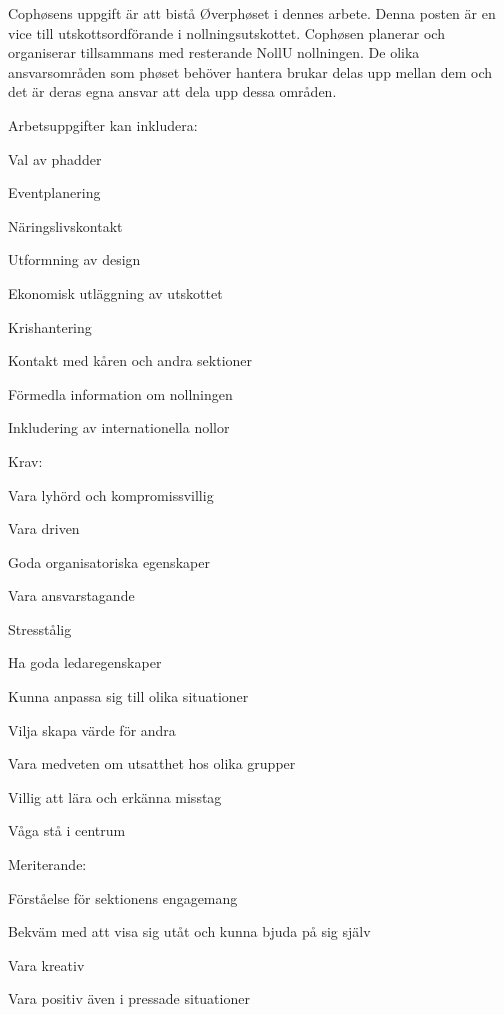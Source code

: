 \documentclass[10pt]{article}
\def\post{Co-phøsare}
\def\doctitle{Kravprofil för \post}
\begin{document}
\heading{\doctitle}

Cophøsens uppgift är att bistå Øverphøset i dennes arbete. Denna posten är en vice till utskottsordförande i nollningsutskottet. Cophøsen planerar och organiserar tillsammans  med resterande NollU nollningen. De olika ansvarsområden som phøset behöver hantera brukar delas upp mellan dem och det är deras egna ansvar att dela upp dessa områden.

Arbetsuppgifter kan inkludera:
\begin{dashlist}
    \item Val av phadder 
    \item Eventplanering
    \item Näringslivskontakt
    \item Utformning av design
    \item Ekonomisk utläggning av utskottet
    \item Krishantering
    \item Kontakt med kåren och andra sektioner
    \item Förmedla information om nollningen
    \item Inkludering av internationella nollor
\end{dashlist}

Krav:
\begin{dashlist}
    \item Vara lyhörd och kompromissvillig
    \item Vara driven
    \item Goda organisatoriska egenskaper
    \item Vara ansvarstagande
    \item Stresstålig
    \item Ha goda ledaregenskaper
    \item Kunna anpassa sig till olika situationer
    \item Vilja skapa värde för andra
    \item Vara medveten om utsatthet hos olika grupper
    \item Villig att lära och erkänna misstag
    \item Våga stå i centrum
\end{dashlist}


Meriterande:
\begin{dashlist}
    \item Förståelse för sektionens engagemang
    \item Bekväm med att visa sig utåt och kunna bjuda på sig själv
    \item Vara kreativ
    \item Vara positiv även i pressade situationer
\end{dashlist}
\end{document}
